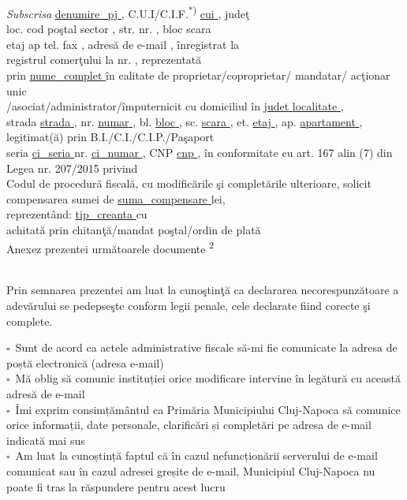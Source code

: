 \documentclass[11pt,a4paper]{article}
\newcommand{\fillline}[1][6cm]{\underline{\hspace{#1}}}
\newcommand{\checkboxempty}{$\square$}
\begin{document}
\hspace{0.5cm}\textit{Subscrisa} \underline{ {{denumire_pj}} }, C.U.I/C.I.F.\textsuperscript{*)} \underline{ {{cui}} }, judeţ \fillline[3cm]\\
loc. \fillline[4cm] cod poştal \fillline[3cm] sector \fillline[1cm], str. \fillline[6cm] nr. \fillline[1.5cm], bloc \fillline[1cm] scara \fillline[1cm]\\
etaj \fillline[1cm] ap \fillline[1cm] tel. \fillline[3cm] fax \fillline[3cm], adresă de e-mail \fillline[5cm], înregistrat la\\
registrul comerţului \fillline[4cm] la nr. \fillline[3cm], reprezentată\\
prin \underline{ {{nume_complet}} } în calitate de proprietar/coproprietar/ mandatar/ acţionar unic\\
/asociat/administrator/împuternicit cu domiciliul în \underline{ {{judet}} } \underline{ {{localitate}} },\\
strada \underline{ {{strada}} }, nr. \underline{ {{numar}} }, bl. \underline{ {{bloc}} }, sc. \underline{ {{scara}} }, et. \underline{ {{etaj}} }, ap. \underline{ {{apartament}} }, legitimat(ă) prin B.I./C.I./C.I.P./Paşaport\\
seria \underline{ {{ci_seria}} } nr. \underline{ {{ci_numar}} }, CNP \underline{ {{cnp}} }, în conformitate cu art. 167 alin (7) din Legea nr. 207/2015 privind\\
Codul de procedură fiscală, cu modificările şi completările ulterioare, solicit compensarea sumei de \underline{ {{suma_compensare}} } lei,\\
reprezentând: \underline{ {{tip_creanta}} } cu \fillline[6cm]\\
achitată prin chitanţă/mandat poştal/ordin de plată \hrulefill\\

\hspace{0.5cm}Anexez prezentei următoarele documente \textsuperscript{2} \hrulefill\\
\hrulefill\\
\hrulefill

\vspace{0.3cm}

Prin semnarea prezentei am luat la cunoştinţă ca declararea necorespunzătoare a adevărului se pedepseşte conform legii penale, cele declarate fiind corecte şi complete.

\vspace{0.2cm}

\checkboxempty\ Sunt de acord ca actele administrative fiscale să-mi fie comunicate la adresa de poștă electronică (adresa e-mail)\\
\checkboxempty\ Mă oblig să comunic instituției orice modificare intervine în legătură cu această adresă de e-mail\\
\checkboxempty\ Îmi exprim consimțământul ca Primăria Municipiului Cluj-Napoca să comunice orice informații, date personale, clarificări și completări pe adresa de e-mail indicată mai sus\\
\checkboxempty\ Am luat la cunoștință faptul că în cazul nefuncționării serverului de e-mail comunicat sau în cazul adresei greșite de e-mail, Municipiul Cluj-Napoca nu poate fi tras la răspundere pentru acest lucru
\end{document}
